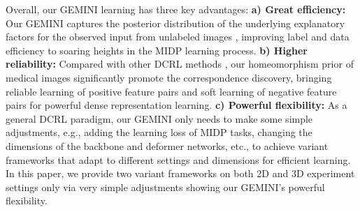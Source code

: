 Overall, our GEMINI learning has three key advantages: \textbf{a) Great efficiency:} Our GEMINI captures the posterior distribution of the underlying explanatory factors for the observed input from unlabeled images \cite{bengio2013representation}, improving label and data efficiency to soaring heights in the MIDP learning process. \textbf{b) Higher reliability:} Compared with other DCRL methods \cite{li2021dense,o2020unsupervised,wang2022densecl,wang2022exploring,xie2021propagate}, our homeomorphism prior of medical images significantly promote the correspondence discovery, bringing reliable learning of positive feature pairs and soft learning of negative feature pairs for powerful dense representation learning. \textbf{c) Powerful flexibility:} As a general DCRL paradigm, our GEMINI only needs to make some simple adjustments, e.g., adding the learning loss of MIDP tasks, changing the dimensions of the backbone and deformer networks, etc., to achieve variant frameworks that adapt to different settings and dimensions for efficient learning. In this paper, we provide two variant frameworks on both 2D and 3D experiment settings only via very simple adjustments showing our GEMINI's powerful flexibility.
